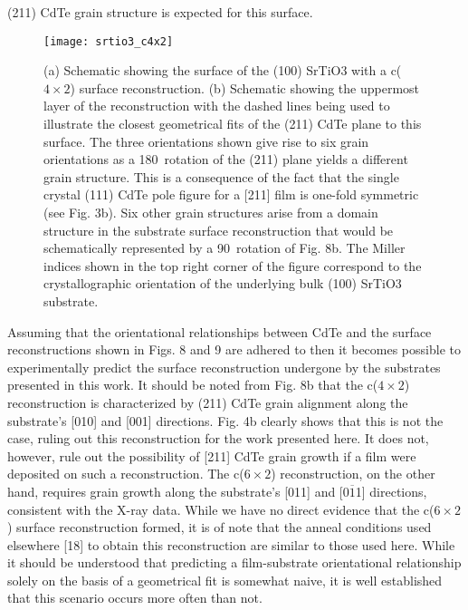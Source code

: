(211) CdTe grain structure is expected for this surface.
\begin{figure}
    \centering
    \texttt{[image: srtio3\_c4x2]}
    \caption{\label{fig:srtio3_c4x2}(a) Schematic showing the surface of the (100) SrTiO3 with a c($4\times2$) surface reconstruction. (b) Schematic showing the uppermost layer of the reconstruction with the dashed lines being used to illustrate the closest geometrical fits of the (211) CdTe plane to this surface. The three orientations shown give rise to six grain orientations as a 180\degree~rotation of the (211) plane yields a different grain structure. This is a consequence of the fact that the single crystal (111) CdTe pole figure for a [211] film is one-fold symmetric (see Fig. 3b). Six other grain structures arise from a domain structure in the substrate surface reconstruction that would be schematically represented by a 90\degree~rotation of Fig. 8b. The Miller indices shown in the top right corner of the figure correspond to the crystallographic orientation of the underlying bulk (100) SrTiO3 substrate.}
\end{figure}
Assuming that the orientational relationships between CdTe
and the surface reconstructions shown in Figs. 8 and 9 are adhered
to then it becomes possible to experimentally predict the surface
reconstruction undergone by the substrates presented in this
work. It should be noted from Fig. 8b that the c($4\times2$)
reconstruction is characterized by (211) CdTe grain alignment
along the substrate’s [010] and [001] directions. Fig. 4b clearly
shows that this is not the case, ruling out this reconstruction for the
work presented here. It does not, however, rule out the possibility
of [211] CdTe grain growth if a film were deposited on such a
reconstruction. The c($6\times2$) reconstruction, on the other hand,
requires grain growth along the substrate’s [011] and [0$\overline{1}$1]
directions, consistent with the X-ray data. While we have no direct
evidence that the c($6\times2$) surface reconstruction formed, it is of
note that the anneal conditions used elsewhere [18] to obtain this
reconstruction are similar to those used here. While it should be
understood that predicting a film-substrate orientational relationship solely on the basis of a geometrical fit is somewhat naive, it is well established that this scenario occurs more often than not.
